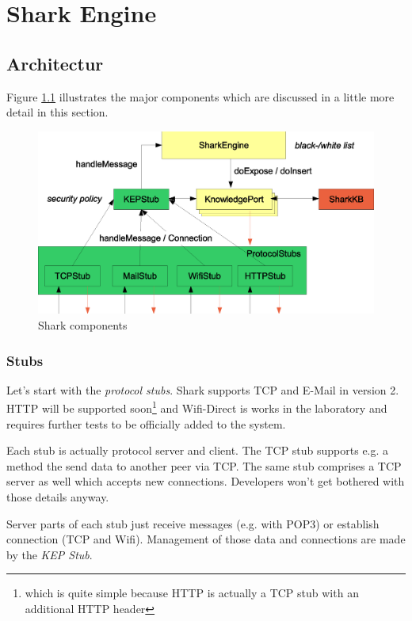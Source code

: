 \chapter{Shark Engine}
\label{sec:sharkengine}

\section{Architectur}
Figure \ref{fig:sharkComponents} illustrates the major components which are discussed in a little more detail in this section.

\begin{figure}[t]
\centering
\includegraphics[width=1.00\textwidth]{sharkComponents.eps}
\caption{Shark components}
\label{fig:sharkComponents}
\end{figure}

\subsection{Stubs}
Let's start with the {\it protocol stubs}. Shark supports TCP and E-Mail in version 2. HTTP will be supported soon\footnote{which is quite simple because HTTP is actually a TCP stub with an additional HTTP header} and Wifi-Direct is works in the laboratory and requires further tests to be officially added to the system.

Each stub is actually protocol server and client. The TCP stub supports e.g. a method the send data to another peer via TCP. The same stub comprises a TCP server as well which accepts new connections. Developers won't get bothered with those details anyway.

Server parts of each stub just receive messages (e.g. with POP3) or establish connection (TCP and Wifi). Management of those data and connections are made by the {\it KEP Stub}.

